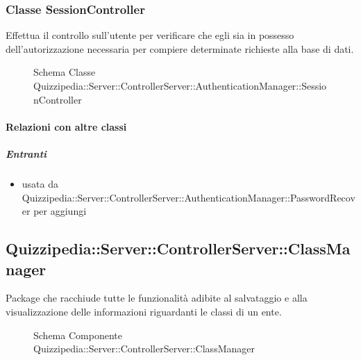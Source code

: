 \subsubsection{Classe SessionController}
Effettua il controllo sull'utente per verificare che egli sia in possesso dell'autorizzazione necessaria per compiere determinate richieste alla base di dati.
\begin{figure}[H]
\centering
\noindent{}
\caption[Schema Classe SessionController]{Schema Classe Quizzipedia::Server::ControllerServer::AuthenticationManager::SessionController}
\end{figure}
\paragraph{Relazioni con altre classi}
\subparagraph{Entranti}
\begin{itemize}
\item usata da Quizzipedia::Server::ControllerServer::AuthenticationManager::PasswordRecover per aggiungi
\end{itemize}
\subsection{Quizzipedia::Server::ControllerServer::ClassManager}
Package che racchiude tutte le funzionalità adibite al salvataggio e alla visualizzazione delle informazioni riguardanti le classi di un ente.
\begin{figure}[H]
\centering
\noindent{}
\caption[Schema Componente Quizzipedia::Server::ControllerServer::ClassManager]{Schema Componente Quizzipedia::Server::ControllerServer::ClassManager}
\end{figure}
